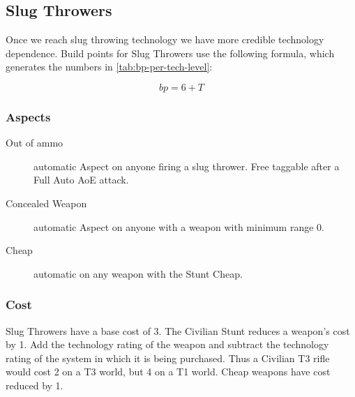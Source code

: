 \iflandscape{\vfil}{}
\subsection{Slug Throwers}
\label{sec:slug-throwers}

Once we reach slug throwing technology we have more credible
technology dependence. Build points for Slug Throwers use the following formula, which generates the numbers in \autoref{tab:bp-per-tech-level}:

\[ bp = 6 + T \]


% 


\subsubsection{Aspects}
\begin{description}
\item[Out of ammo]
automatic Aspect on anyone firing a slug thrower. Free
taggable after a Full Auto AoE attack.
\item[Concealed Weapon]
automatic Aspect on anyone with a weapon with minimum range 0.
\item[Cheap]
automatic on any weapon with the Stunt Cheap.
\end{description}

\subsubsection{Cost}

Slug Throwers have a base cost of 3. The Civilian Stunt reduces a
weapon's cost by 1. Add the technology rating of the weapon and
subtract the technology rating of the system in which it is being
purchased. Thus a Civilian T3 rifle would cost 2 on a T3 world, but 4
on a T1 world. Cheap weapons have cost reduced by 1.

